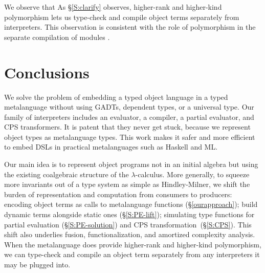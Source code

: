 \ifshort We observe that \else As \S\ref{S:clarify} observes, \fi
higher-rank and higher-kind
polymorphism lets us type-check and compile object terms separately from
interpreters.  This \ifshort\else observation \fi is consistent with the role of
polymorphism in the separate compilation of modules
\citep{shao-typed}.

\section{Conclusions}\label{conclusion}

We solve the problem of embedding a typed object language in a typed
metalanguage without using GADTs, dependent types, or a universal type.
Our family of interpreters includes an evaluator, a compiler, a partial
evaluator, and CPS transformers.  It is patent that they never get stuck,
because we represent object types as metalanguage types.  This work
makes it safer and more efficient to embed DSLs
in practical metalanguages such as Haskell and ML\@.

Our main idea is to represent object programs not in an initial algebra
but using the existing coalgebraic structure of the $\lambda$-calculus.
More generally, to squeeze more invariants out of a type system as
simple as Hindley-Milner, we shift the burden of representation and
computation from consumers to producers: encoding object terms as calls
to metalanguage functions (\S\ref{ourapproach}); build dynamic terms
alongside static ones (\S\ref{S:PE-lift}); simulating type functions for
partial evaluation (\S\ref{S:PE-solution}) and CPS
transformation\ifshort\else~(\S\ref{S:CPS})\fi.
This shift also underlies fusion,
functionalization, and amortized complexity analysis.
\ifshort\else
When the metalanguage does provide higher-rank and higher-kind
polymorphism, we can type-check and compile an object term separately
from any interpreters it may be plugged into.
\fi
